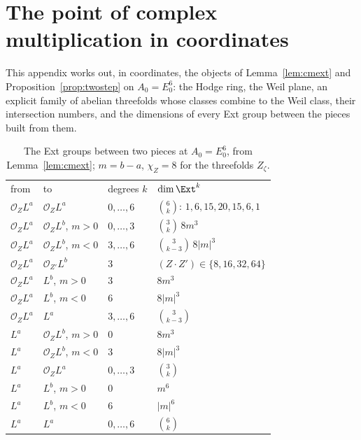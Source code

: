 \section{The point of complex multiplication in coordinates}\label{app:cmpoint}

This appendix works out, in coordinates, the objects of Lemma~\ref{lem:cmext} and Proposition~\ref{prop:twostep} on $A_{0}=E_{0}^{6}$: the Hodge ring, the Weil plane, an explicit family of abelian threefolds whose classes combine to the Weil class, their intersection numbers, and the dimensions of every Ext group between the pieces built from them.

\begin{table}[t]
\centering
\caption{The Ext groups between two pieces at $A_{0}=E_{0}^{6}$, from Lemma~\ref{lem:cmext}; $m=b-a$, $\chi_{Z}=8$ for the threefolds $Z_{\zeta}$.}
\label{tab:cmext}
\begin{ruledtabular}
\begin{tabular}{llll}
from & to & degrees $k$ & $\dim\Ext^{k}$ \\
\colrule
$\mathcal{O}_{Z}L^{a}$ & $\mathcal{O}_{Z}L^{a}$ & $0,\dots,6$ & $\binom{6}{k}$: $1,6,15,20,15,6,1$ \\
$\mathcal{O}_{Z}L^{a}$ & $\mathcal{O}_{Z}L^{b}$, $m>0$ & $0,\dots,3$ & $\binom{3}{k}\,8m^{3}$ \\
$\mathcal{O}_{Z}L^{a}$ & $\mathcal{O}_{Z}L^{b}$, $m<0$ & $3,\dots,6$ & $\binom{3}{k-3}\,8|m|^{3}$ \\
$\mathcal{O}_{Z}L^{a}$ & $\mathcal{O}_{Z'}L^{b}$ & $3$ & $(Z\cdot Z')\in\{8,16,32,64\}$ \\
$\mathcal{O}_{Z}L^{a}$ & $L^{b}$, $m>0$ & $3$ & $8m^{3}$ \\
$\mathcal{O}_{Z}L^{a}$ & $L^{b}$, $m<0$ & $6$ & $8|m|^{3}$ \\
$\mathcal{O}_{Z}L^{a}$ & $L^{a}$ & $3,\dots,6$ & $\binom{3}{k-3}$ \\
$L^{a}$ & $\mathcal{O}_{Z}L^{b}$, $m>0$ & $0$ & $8m^{3}$ \\
$L^{a}$ & $\mathcal{O}_{Z}L^{b}$, $m<0$ & $3$ & $8|m|^{3}$ \\
$L^{a}$ & $\mathcal{O}_{Z}L^{a}$ & $0,\dots,3$ & $\binom{3}{k}$ \\
$L^{a}$ & $L^{b}$, $m>0$ & $0$ & $m^{6}$ \\
$L^{a}$ & $L^{b}$, $m<0$ & $6$ & $|m|^{6}$ \\
$L^{a}$ & $L^{a}$ & $0,\dots,6$ & $\binom{6}{k}$ \\
\end{tabular}
\end{ruledtabular}
\end{table}


